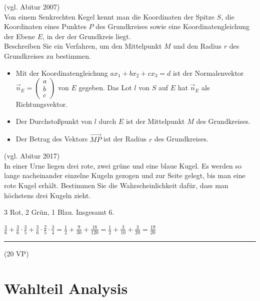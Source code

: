 \aufgabe{} (vgl. Abitur 2007)\\
Von einem Senkrechten Kegel kennt man die Koordinaten der Spitze $S$, die Koordinaten eines Punktes $P$ des Grundkreises sowie eine Koordinatengleichung der Ebene $E$, in der der Grundkreis liegt.
\\Beschreiben Sie ein Verfahren, um den Mittelpunkt $M$ und den Radius $r$ des Grundkreises zu bestimmen.

\begin{lsg}{}
\begin{itemize}
  \item Mit der Koordinatengleichung $ax_1+bx_2+cx_3=d$ ist der Normalenvektor $\vec n_E=\left(\begin{array}{c}a\\b\\c\end{array}\right)$ von $E$ gegeben.
  Das Lot $l$ von $S$ auf $E$ hat $\vec n_E$ als Richtungsvektor.
  \item Der Durchstoßpunkt von $l$ durch $E$ ist der Mittelpunkt $M$ des Grundkreises.
  \item Der Betrag des Vektors $\overrightarrow{MP}$ ist der Radius $r$ des Grundkreises.
\end{itemize}
\end{lsg}

\aufgabe{} (vgl. Abitur 2017)\\
In einer Urne liegen drei rote, zwei grüne und eine blaue Kugel. Es werden so lange nacheinander einzelne Kugeln gezogen und zur Seite gelegt, bis man eine rote Kugel erhält. Bestimmen Sie die Wahrscheinlichkeit dafür, dass man höchstens drei Kugeln zieht. 
\begin{lsg}{}
3 Rot, 2 Grün, 1 Blau. Insgesamt 6.

$\frac 3 6 + \frac 3 6 \cdot\frac 3 5 + \frac 3 6 \cdot \frac 2 5 \cdot \frac 3 4 = \frac 1 2+\frac{9}{30} +\frac{18}{120}=\frac 1 2 + \frac{3}{10}+  \frac{3}{20} = \frac{19}{20}$
\end{lsg}

\vfill

\hfill\rule{1.5cm}{0.4mm}

\hfill (20 VP)\hspace{0.22cm}







\section{Wahlteil Analysis}

